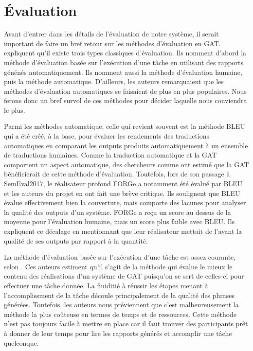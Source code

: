 \chapter{Évaluation}\label{ch:eval}

Avant d'entrer dans les détails de l'évaluation de notre système, il serait important de faire un bref retour sur les méthodes d'évaluation en \ac{GAT}. \cite{ReiterInvestigationValidityMetrics2009} expliquent qu'il existe trois types classiques d'évaluation. Ils nomment d'abord la méthode d'évaluation basée sur l'exécution d'une tâche en utilisant des rapports génénés automatiquement. Ils nomment aussi la méthode d'évaluation humaine, puis la méthode automatique. D'ailleurs, les auteurs remarquaient que les méthodes d'évaluation automatiques se faisaient de plus en plus populaires. Nous ferons donc un bref survol de ces méthodes pour décider laquelle nous conviendra le plus.

Parmi les méthodes automatique, celle qui revient souvent est la méthode BLEU qui a été créé, à la base, pour évaluer les rendements des traductions automatiques en comparant les outputs produits automatiquement à un ensemble de traductions humaines. Comme la traduction automatique et la \ac{GAT} comportent un aspect automatique, des chercheurs comme \cite{Habash2003MatadorAL, Langkilde-gearyForestbasedstatisticalsentence2000} ont estimé que la \ac{GAT} bénéficierait de cette méthode d'évaluation. Toutefois, lors de son passage à SemEval2017, le réalisateur profond FORGe \citep{DBLP:conf/semeval/MilleCBW17} a notamment été évalué par BLEU et les auteurs du projet en ont fait une brève critique. Ils soulignent que BLEU évalue effectivement bien la couverture, mais comporte des lacunes pour analyser la qualité des outputs d'un système. FORGe a reçu un score au dessus de la moyenne pour l'évaluation humaine, mais un score plus faible avec BLEU. Ils expliquent ce décalage en mentionnant que leur réalisateur mettait de l'avant la qualité de ses outputs par rapport à la quantité.

La méthode d'évaluation basée sur l'exécution d'une tâche est assez courante, selon \cite{ReiterInvestigationValidityMetrics2009}. Ces auteurs estiment qu'il s'agit de la méthode qui évalue le mieux le contenu des réalisations d'un système de \ac{GAT} puisqu'on se sert de celles-ci pour effectuer une tâche donnée. La fluiditié à réussir les étapes menant à l'accomplissment de la tâche découle principalement de la qualité des phrases générées. Toutefois, les auteurs nous préviennent que c'est malheureusement la méthode la plus coûteuse en termes de temps et de ressources. Cette méthode n'est pas toujours facile à mettre en place car il faut trouver des participants prêt à donner de leur temps pour lire les rapports générés et accomplir une tâche quelconque.

